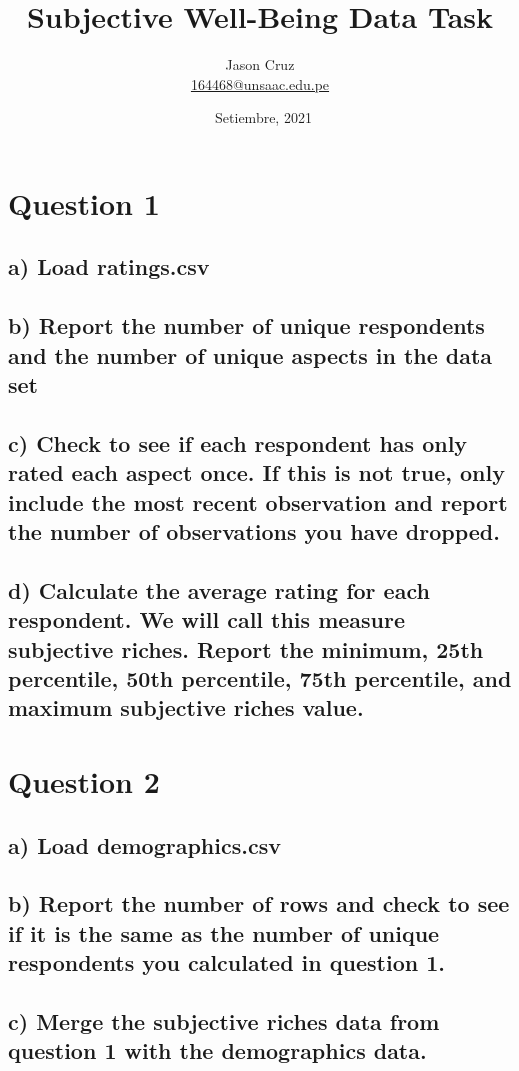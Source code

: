 \documentclass[12pt,a4paper]{article}
\title{\huge{Subjective Well-Being Data Task}}
\author{ 
	Jason Cruz\\ 
	\href{mailto:164468@unsaac.edu.pe}{164468@unsaac.edu.pe}
}
\date{\ Setiembre, 2021}
\begin{document}
	\maketitle 
	
	
\section*{{\textcolor[rgb]{0.0667, 0.1255, 0.1922}{Question 1}}}
	\subsection*{\normalsize{a) Load ratings.csv}}
	\subsection*{\normalsize{b) Report the number of unique respondents and the number of unique aspects in the data set}}
	\subsection*{\normalsize{c) Check to see if each respondent has only rated each aspect once. If this is not true, only include the most recent observation and report the number of observations you have dropped.}}
	\subsection*{\normalsize{d) Calculate the average rating for each respondent. We will call this measure subjective riches. Report the minimum, 25th percentile, 50th percentile, 75th percentile, and maximum subjective riches value.}}	
\section*{{\textcolor[rgb]{0.0667, 0.1255, 0.1922}{Question 2}}}
	\subsection*{\normalsize{a) Load demographics.csv}}
	\subsection*{\normalsize{b) Report the number of rows and check to see if it is the same as the number of unique respondents you calculated in question 1.}}
	\subsection*{\normalsize{c) Merge the subjective riches data from question 1 with the demographics data.}}
\end{document}
